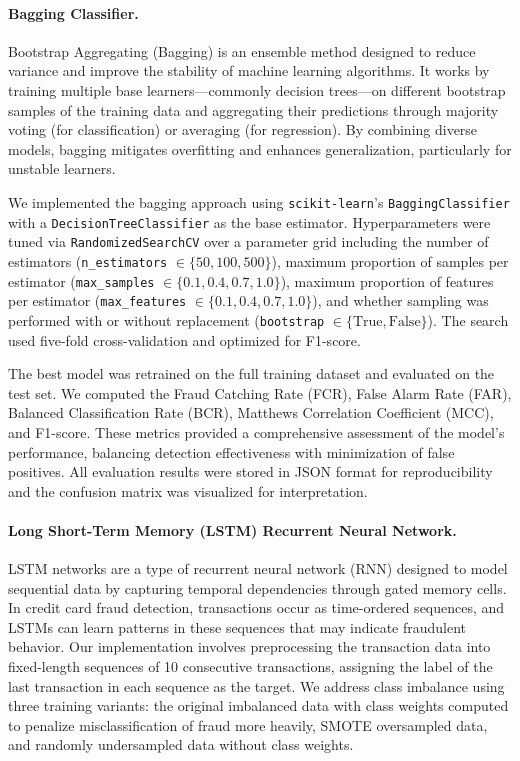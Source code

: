 \documentclass{article}
\begin{document}
\paragraph{Bagging Classifier.}
Bootstrap Aggregating (Bagging) is an ensemble method designed to reduce variance and improve the stability of machine learning algorithms. It works by training multiple base learners—commonly decision trees—on different bootstrap samples of the training data and aggregating their predictions through majority voting (for classification) or averaging (for regression). By combining diverse models, bagging mitigates overfitting and enhances generalization, particularly for unstable learners.

We implemented the bagging approach using \texttt{scikit-learn}'s \texttt{BaggingClassifier} with a \texttt{DecisionTreeClassifier} as the base estimator. Hyperparameters were tuned via \texttt{RandomizedSearchCV} over a parameter grid including the number of estimators (\texttt{n\_estimators} $\in \{50, 100, 500\}$), maximum proportion of samples per estimator (\texttt{max\_samples} $\in \{0.1, 0.4, 0.7, 1.0\}$), maximum proportion of features per estimator (\texttt{max\_features} $\in \{0.1, 0.4, 0.7, 1.0\}$), and whether sampling was performed with or without replacement (\texttt{bootstrap} $\in \{\text{True}, \text{False}\}$). The search used five-fold cross-validation and optimized for F1-score.

The best model was retrained on the full training dataset and evaluated on the test set. We computed the Fraud Catching Rate (FCR), False Alarm Rate (FAR), Balanced Classification Rate (BCR), Matthews Correlation Coefficient (MCC), and F1-score. These metrics provided a comprehensive assessment of the model’s performance, balancing detection effectiveness with minimization of false positives. All evaluation results were stored in JSON format for reproducibility and the confusion matrix was visualized for interpretation.

\paragraph{Long Short-Term Memory (LSTM) Recurrent Neural Network.}
LSTM networks are a type of recurrent neural network (RNN) designed to model sequential data by capturing temporal dependencies through gated memory cells. In credit card fraud detection, transactions occur as time-ordered sequences, and LSTMs can learn patterns in these sequences that may indicate fraudulent behavior.
Our implementation involves preprocessing the transaction data into fixed-length sequences of 10 consecutive transactions, assigning the label of the last transaction in each sequence as the target. We address class imbalance using three training variants: the original imbalanced data with class weights computed to penalize misclassification of fraud more heavily, SMOTE oversampled data, and randomly undersampled data without class weights.
\end{document}
